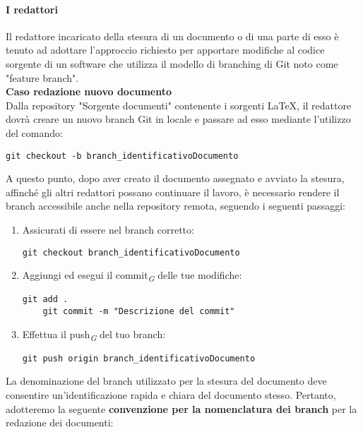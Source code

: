 \documentclass{article}
\begin{document}
    \paragraph{I redattori}

    Il redattore incaricato della stesura di un documento o di una parte di esso è tenuto ad adottare l'approccio richiesto per apportare modifiche al codice sorgente di un software che utilizza il modello di branching di Git noto come "feature branch".\\
    \vspace{0.1cm}
    \textbf{Caso redazione nuovo documento}\\
Dalla repository  "Sorgente documenti" contenente i sorgenti \LaTeX, il redattore dovrà creare un nuovo branch Git in locale e passare ad esso mediante l'utilizzo del comando:

    \begin{lstlisting}[style=code]
    git checkout -b branch_identificativoDocumento 
    \end{lstlisting}

    A questo punto, dopo aver creato il documento assegnato e avviato la stesura, affinché gli altri redattori possano continuare il lavoro, è necessario rendere il branch accessibile anche nella repository remota, seguendo i seguenti passaggi:

    \begin{enumerate}
        \item Assicurati di essere nel branch corretto:
        \begin{lstlisting}[style=code]
    git checkout branch_identificativoDocumento 
        \end{lstlisting}

        \item Aggiungi ed esegui il commit\textsubscript{\textit{G}} delle tue modifiche:
        \begin{lstlisting}[style=code]
    git add .
    git commit -m "Descrizione del commit"
        \end{lstlisting}
        
        \item Effettua il push\textsubscript{\textit{G}} del tuo branch:
        \begin{lstlisting}[style=code]
    git push origin branch_identificativoDocumento
        \end{lstlisting}
    \end{enumerate}

    La denominazione del branch utilizzato per la stesura del documento deve consentire un'identificazione rapida e chiara del documento stesso. Pertanto, adotteremo la seguente \textbf{convenzione per la nomenclatura dei branch} per la redazione dei documenti:
\end{document}
